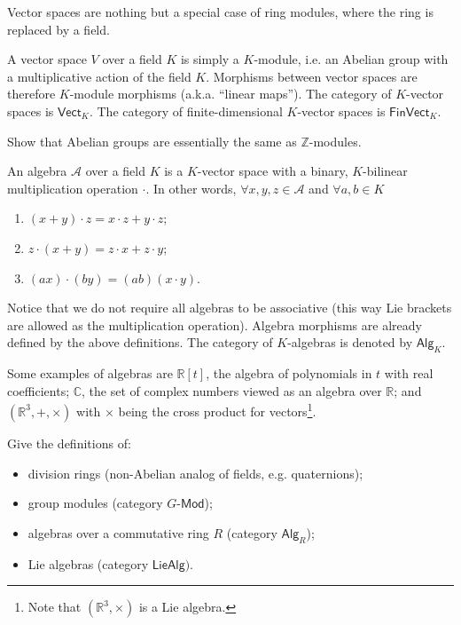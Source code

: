 \documentclass[english,letterpaper]{article}%
\numberwithin{equation}{section}
\numberwithin{figure}{section}
\numberwithin{table}{section}
\theoremstyle{definition}
\theoremstyle{definition}
\theoremstyle{definition}
\theoremstyle{plain}
\theoremstyle{plain}
\theoremstyle{plain}
\theoremstyle{plain}
\theoremstyle{remark}
\theoremstyle{remark}
\begin{document}
Vector spaces are nothing but a special case of ring modules, where
the ring is replaced by a field.
\begin{defn}
A vector space $V$ over a field $K$ is simply a $K$-module, i.e.
an Abelian group with a multiplicative action of the field $K$. Morphisms
between vector spaces are therefore $K$-module morphisms (a.k.a.
``linear maps''). The category of $K$-vector spaces is $\mathsf{Vect}_{K}$.
The category of finite-dimensional $K$-vector spaces is $\mathsf{FinVect}_{K}$.
\end{defn}
\begin{xca}
Show that Abelian groups are essentially the same as $\mathbb{Z}$-modules.
\end{xca}
\begin{defn}
An algebra $\mathcal{A}$ over a field $K$ is a $K$-vector space
with a binary, $K$-bilinear multiplication operation $\cdot$. In
other words, $\forall x,y,z\in\mathcal{A}$ and $\forall a,b\in K$ 
\begin{enumerate}
\item $(x+y)\cdot z=x\cdot z+y\cdot z$;
\item $z\cdot(x+y)=z\cdot x+z\cdot y$;
\item $(ax)\cdot(by)=(ab)(x\cdot y)$.
\end{enumerate}
\end{defn}
Notice that we do not require all algebras to be associative (this
way Lie brackets are allowed as the multiplication operation). Algebra
morphisms are already defined by the above definitions. The category
of $K$-algebras is denoted by $\mathsf{Alg}_{K}$.
\begin{example}
Some examples of algebras are $\mathbb{R}[t]$, the algebra of polynomials
in $t$ with real coefficients; $\mathbb{C}$, the set of complex
numbers viewed as an algebra over $\mathbb{R}$; and $(\mathbb{R}^{3},+,\times)$
with $\times$ being the cross product for vectors\footnote{Note that $(\mathbb{R}^{3},\times)$ is a Lie algebra.}.
\end{example}
\begin{xca}
Give the definitions of:
\begin{itemize}
\item division rings (non-Abelian analog of fields, e.g. quaternions);
\item group modules (category $G\text{-}\mathsf{Mod}$);
\item algebras over a commutative ring $R$ (category $\mathsf{Alg}_{R}$);
\item Lie algebras (category $\mathsf{LieAlg})$.
\end{itemize}
\end{xca}
\end{document}
